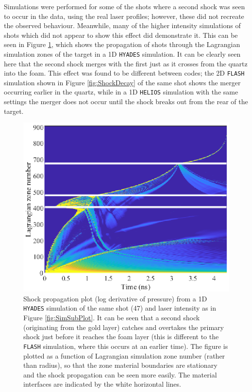 Simulations were performed for some of the shots where a second shock was seen to occur in the data, using the real laser profiles; however, these did not recreate the observed behaviour. Meanwhile, many of the higher intensity simulations of shots which did not appear to show this effect did demonstrate it. This can be seen in Figure \ref{fig:ShockPlot}, which shows the propagation of shots through the Lagrangian simulation zones of the target in a 1D \texttt{HYADES} simulation. It can be clearly seen here that the second shock merges with the first just as it crosses from the quartz into the foam. This effect was found to be different between codes; the 2D \texttt{FLASH} simulation shown in Figure \ref{fig:ShockDecay} of the same shot shows the merger occurring earlier in the quartz, while in a 1D \texttt{HELIOS} simulation with the same settings the merger does not occur until the shock breaks out from the rear of the target.

\begin{figure}
\begin{centering}
\includegraphics{figures/Experiment/ShockPlot2.eps}%
\caption{\label{fig:ShockPlot} Shock propagation plot (log derivative of pressure) from a 1D \texttt{HYADES} simulation of the same shot (47) and laser intensity as in Figure \ref{fig:SimSubPlot}. It can be seen that a second shock (originating from the gold layer) catches and overtakes the primary shock just before it reaches the foam layer (this is different to the \texttt{FLASH} simulation, where this occurs at an earlier time). The figure is plotted as a function of Lagrangian simulation zone number (rather than radius), so that the zone material boundaries are stationary and the shock propagation can be seen more easily. The material interfaces are indicated by the white horizontal lines.}
\end{centering}
\end{figure}

